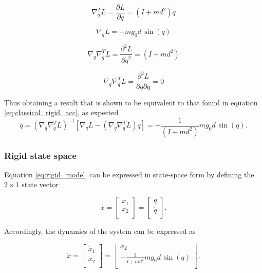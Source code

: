 \documentclass[a4paper]{article}
\begin{document}
\begin{equation}
    \nonumber
    \nabla_{\dot{q}}^{T} L = \frac{\partial L}{\partial \dot{q}} = (I+md^2)\dot{q}
\end{equation}

\begin{equation}
    \nonumber
    \nabla_{q} L = -mg_0d\,\sin(q)
\end{equation}

\begin{equation}
    \nonumber
    \nabla_{\dot{q}} \nabla_{\dot{q}}^{T} L = \frac{\partial^{2} L}{\partial \dot{q}^{2}} = (I+md^2)
\end{equation}

\begin{equation}
    \nonumber
    \nabla_{q} \nabla_{\dot{q}}^{T} L = \frac{\partial^{2} L}{\partial{q} \partial{\dot{q}}} = 0
\end{equation}

Thus obtaining a result that is shown to be equivalent to that found in equation \eqref{eq:classical_rigid_acc}, as expected
\begin{equation}
    \nonumber
    \ddot{q} = (\nabla_{\dot{q}}\nabla_{\dot{q}}^T L)^{-1} [\nabla_{q} L - (\nabla_{q}\nabla_{\dot{q}}^T L)\dot{q}] = -\frac{1}{(I+md^2)}mg_0d\, \sin(q).
\end{equation}

\subsubsection{Rigid state space}
Equation \eqref{eq:rigid_model} can be expressed in state-space form by defining the $2\times1$ state vector

\begin{equation}
    \nonumber
    x = 
    \begin{bmatrix}    
        x_1 \\
        x_2 \\
    \end{bmatrix} = \begin{bmatrix}    
        q\\
        \dot{q}\\
    \end{bmatrix}.
\end{equation}

Accordingly, the dynamics of the system can be expressed as

\begin{equation}
    \nonumber
    \dot{x} = 
    \begin{bmatrix}    
        \dot{x}_1 \\
        \dot{x}_2 \\
    \end{bmatrix} = \begin{bmatrix}    
        x_2\\
        -\frac{1}{I+md^2}mg_0d\, \sin(q)\\
    \end{bmatrix}.
\end{equation}
\end{document}
